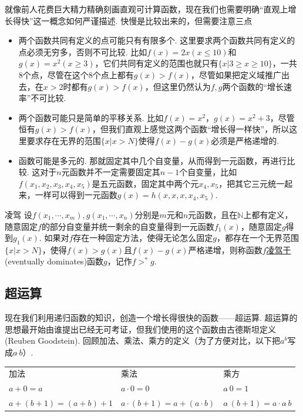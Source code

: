 就像前人花费巨大精力精确刻画直观可计算函数，现在我们也需要明确“直观上增长得快”这一概念如何严谨描述. 快慢是比较出来的，但需要注意三点
\begin{itemize}
    \item 两个函数共同有定义的点可能只有有限多个. 这里要求两个函数共同有定义的点必须无穷多，否则不可比较. 比如\(f(x)=2x(x \leq 10)\)和\(g(x)=x^2(x\geq 3)\)，它们共同有定义的范围也就只有\(\{x|3 \geq x \geq 10\}\)，一共\(8\)个点，尽管在这个\(8\)个点上都有\(g(x) > f(x)\)，尽管如果把定义域推广出去，在\(x > 2\)时都有\(g(x) > f(x)\)，但这里仍然认为\(f,g\)两个函数的“增长速率”不可比较.
    \item 两个函数可能只是简单的平移关系. 比如\(f(x)=x^2\)，\(g(x)=x^2+3\)，尽管恒有\(g(x) > f(x)\)，但我们直观上感觉这两个函数“增长得一样快”，所以这里要求存在无界的范围\(\{x|x > N\}\)使得\(f(x)-g(x)\)必须是严格递增的.
    \item 函数可能是多元的. 那就固定其中几个自变量，从而得到一元函数，再进行比较. 这对于\(n\)元函数并不一定需要固定其\(n-1\)个自变量，比如\(f(x_1,x_2,x_3,x_4,x_5)\)是五元函数，固定其中两个元\(x_4,x_5\)，把其它三元统一起来，一样可以得到一元函数\(g(x)=h(x,x,x,x_4,x_5)\).
\end{itemize}

\begin{definition}{凌驾}
    设\(f(x_1, \cdots, x_m),g(x_1, \cdots, x_n)\)分别是\(m\)元和\(n\)元函数，且在\(\mathbb{N}\)上都有定义，随意固定\(f\)的部分自变量并统一剩余的自变量得到一元函数\(f_1(x)\)，随意固定\(g\)得到\(g_1(x)\). 如果对\(f\)存在一种固定方法，使得无论怎么固定\(g\)，都存在一个无界范围\(\{x| x > N\}\)，使得\(f(x) > g(x)\)且\(f(x) - g(x)\)严格递增，则称函数\(f\)\underline{凌驾于}(eventually dominates)函数\(g\)，记作\(f >^* g\).
\end{definition}

\subsection{超运算}

现在我们利用递归函数的知识，创造一个增长得很快的函数——超运算. 超运算的思想最开始由谁提出已经无可考证，但我们使用的这个函数由古德斯坦定义(Reuben Goodstein). 回顾加法、乘法、乘方的定义（为了方便对比，以下把\(a^b\)写成\(a\hat{\ }b\)）.
\begin{reference}
    \begin{tabular}{lll}
        加法 & 乘法 & 乘方 \\
        \(a+0 = a\) & \(a \cdot 0 = 0\) & \(a\hat{\ }0 = 1\) \\
        \(a+(b+1) = (a+b)+1\) & \(a \cdot (b+1) = a+ (a \cdot b)\) & \(a\hat{\ }(b+1) = a \cdot a\hat{\ }b\)
    \end{tabular}
\end{reference}

